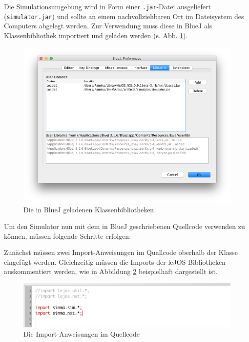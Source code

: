 \documentclass[paper=a4, DIV=calc, BCOR=12mm, twoside=on, onecolumn=on, open = right, titlepage =on, parskip =half-, headsepline = on, footsepline = off, chapterprefix = off, appendixprefix = on, fontsize = 12pt, numbers = noenddot, abstract = on]{scrbook}
\begin{document}
Die Simulationsumgebung wird in Form einer \texttt{.jar}-Datei ausgeliefert (\texttt{simulator.jar}) und sollte an einem nachvollziehbaren Ort im Dateisystem des Computers abgelegt werden. Zur Verwendung muss diese in BlueJ als Klassenbibliothek importiert und geladen werden (s. Abb. \ref{fig:library}).

\begin{figure}[htbp]
\centering
\includegraphics[width=\textwidth]{images/Anleitung_Library.png}
\caption{Die in BlueJ geladenen Klassenbibliotheken}
\label{fig:library}
\end{figure}


Um den Simulator nun mit dem in BlueJ geschriebenen Quellcode verwenden zu können, müssen folgende Schritte erfolgen:

Zunächst müssen zwei Import-Anweisungen im Quallcode oberhalb der Klasse eingefügt werden. Gleichzeitig müssen die Imports der leJOS-Bibliotheken auskommentiert werden, wie in Abbildung \ref{fig:import} beispielhaft dargestellt ist.

\begin{figure}[htbp]
\centering
\includegraphics[width=\textwidth]{images/Anleitung_Import.png}
\caption{Die Import-Anweisungen im Quellcode}
\label{fig:import}
\end{figure}
\end{document}
